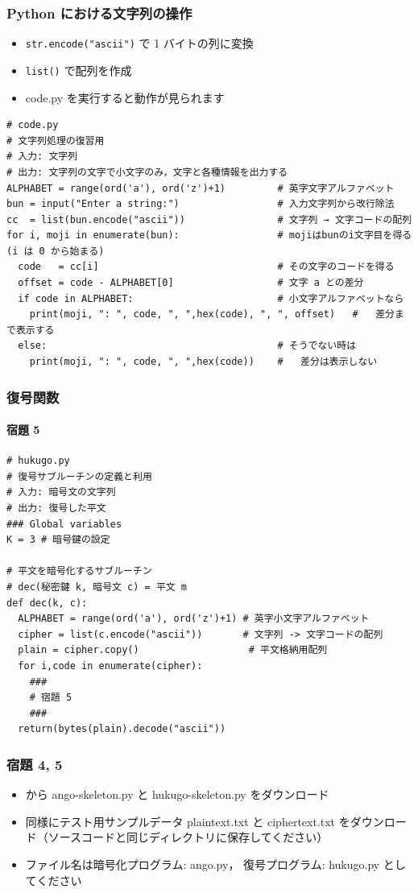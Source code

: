 \begin{frame}
\frametitle{Python における文字列の操作}
  \begin{itemize}
\item {\tt str.encode("ascii")} で 1 バイトの列に変換
\item {\tt list()} で配列を作成
\item code.py を実行すると動作が見られます
  \end{itemize}
  \begin{lstlisting}[caption={code.py},label=lst:code]
# code.py
# 文字列処理の復習用
# 入力: 文字列
# 出力: 文字列の文字で小文字のみ，文字と各種情報を出力する
ALPHABET = range(ord('a'), ord('z')+1)         # 英字文字アルファベット
bun = input("Enter a string:")                 # 入力文字列から改行除法
cc  = list(bun.encode("ascii"))                # 文字列 → 文字コードの配列
for i, moji in enumerate(bun):                 # mojiはbunのi文字目を得る (i は 0 から始まる)
  code   = cc[i]                               # その文字のコードを得る
  offset = code - ALPHABET[0]                  # 文字 a との差分
  if code in ALPHABET:                         # 小文字アルファベットなら
    print(moji, ": ", code, ", ",hex(code), ", ", offset)   #   差分まで表示する
  else:                                        # そうでない時は
    print(moji, ": ", code, ", ",hex(code))    #   差分は表示しない
  \end{lstlisting}
\end{frame}
\begin{frame}
\frametitle{復号関数}
\framesubtitle{宿題 5}
  \begin{lstlisting}[caption={hukugo.py},label=lst:hukugo]
# hukugo.py
# 復号サブルーチンの定義と利用
# 入力: 暗号文の文字列
# 出力: 復号した平文
### Global variables
K = 3 # 暗号鍵の設定

# 平文を暗号化するサブルーチン
# dec(秘密鍵 k, 暗号文 c) = 平文 m
def dec(k, c):
  ALPHABET = range(ord('a'), ord('z')+1) # 英字小文字アルファベット
  cipher = list(c.encode("ascii"))       # 文字列 -> 文字コードの配列
  plain = cipher.copy()                   # 平文格納用配列
  for i,code in enumerate(cipher):
    ###
    # 宿題 5
    ###
  return(bytes(plain).decode("ascii"))
  \end{lstlisting}
\end{frame}
\begin{frame}
\frametitle{宿題 4, 5}
  \begin{itemize}
\item \href{https://sites.google.com/presystems.xyz/elementarycs/top}{}から ango-skeleton.py と hukugo-skeleton.py をダウンロード
\item 同様にテスト用サンプルデータ plaintext.txt と ciphertext.txt をダウンロード（ソースコードと同じディレクトリに保存してください）
\item ファイル名は暗号化プログラム: ango.py， 復号プログラム: hukugo.py としてください
  \end{itemize}
\end{frame}
